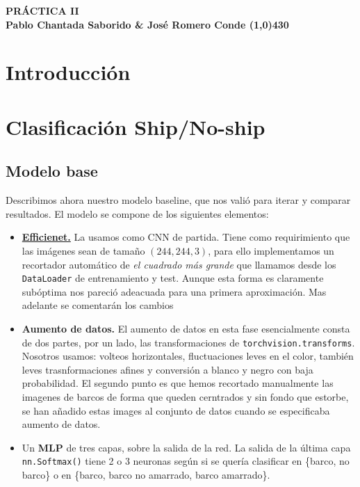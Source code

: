 \documentclass{article}
\begin{document}
	\begin{center}
		\LARGE\bfseries PRÁCTICA II\\
		\small Pablo Chantada Saborido \& José Romero Conde
		\line(1,0){430}
	\end{center}
	
\section*{Introducción}

\section*{Clasificación Ship/No-ship}
\subsection*{Modelo base}

Describimos ahora nuestro modelo baseline, que nos valió para iterar y comparar resultados. El modelo se compone de los siguientes elementos:

\begin{itemize}
	\item  \textbf{\href{https://arxiv.org/pdf/1905.11946}{Efficienet.}} La usamos como CNN de partida. Tiene como requirimiento que las imágenes sean de tamaño $(244,244,3)$, para ello implementamos un recortador automático de \emph{el cuadrado más grande} que llamamos desde los \texttt{DataLoader} de entrenamiento y test. Aunque esta forma es claramente subóptima nos pareció adeacuada para una primera aproximación. Mas adelante se comentarán los cambios
	\item \textbf{Aumento de datos.} El aumento de datos en esta fase esencialmente consta de dos partes, por un lado, las transformaciones de \texttt{torchvision.transforms}. Nosotros usamos: volteos horizontales, fluctuaciones leves en el color, también leves trasnformaciones afines y conversión a blanco y negro con baja probabilidad. El segundo punto es que hemos recortado manualmente las imagenes de barcos de forma que queden cerntrados y sin fondo que estorbe, se han añadido estas images al conjunto de datos cuando se especificaba aumento de datos.
	\item Un \textbf{MLP} de tres capas, sobre la salida de la red. La salida de la última capa \texttt{nn.Softmax()} tiene 2 o 3 neuronas según si se quería clasificar en \{barco, no barco\} o en \{barco, barco no amarrado, barco amarrado\}. 
\end{itemize}
\end{document}

